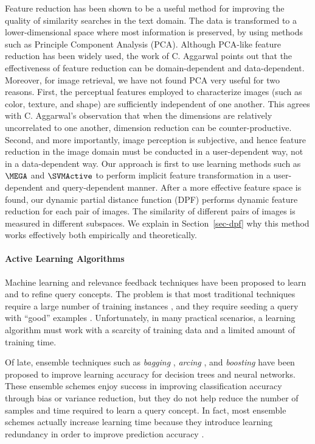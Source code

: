 Feature reduction has been shown to be a useful method for improving
the quality of similarity searches in the text domain.  The data is
transformed to a lower-dimensional space where most information is
preserved, by using methods such as Principle Component Analysis
(PCA).  Although PCA-like feature reduction has been widely used, the
work of C. Aggarwal \cite{Agg-PODS01} points out that the effectiveness
of feature reduction can be domain-dependent and data-dependent.
Moreover, for image retrieval, we have not found PCA very useful for
two reasons.  First, the perceptual features employed to characterize
images (such as color, texture, and shape) are sufficiently independent
of one another.  This agrees with C. Aggarwal's observation that when
the dimensions are relatively uncorrelated to one another, dimension
reduction can be counter-productive.  Second, and more importantly,
image perception is subjective, and hence feature reduction in the
image domain must be conducted in a user-dependent way, not in a
data-dependent way.  Our approach is first to use learning methods such
as $\MEGA$ and $\SVMActive$ to perform implicit feature transformation
in a user-dependent and query-dependent manner.  After a more effective
feature space is found, our dynamic partial distance function (DPF)
performs dynamic feature reduction for each pair of images. The
similarity of different pairs of images is measured in different
subspaces.  We explain in Section~\ref{sec-dpf} why this method works
effectively both empirically and theoretically.

\paragraph{Active Learning Algorithms}

Machine learning and relevance feedback techniques 
have been proposed to learn and to refine query concepts.
The problem is that most traditional techniques
require a large number of training instances \cite{Bish98,KV94,Mit97,ZH01}, 
and they require seeding a query with ``good'' 
examples \cite{JW97,PCM99,WFSP00}.
Unfortunately, in many practical scenarios, 
a learning algorithm must work with
a scarcity of training data
and a limited amount of training time.

Of late, ensemble techniques such as {\em bagging} \cite{Bre96},
{\em arcing} \cite{Bre98},
and {\em boosting} \cite{Grove+Schuurmans:AAAI98,Schapire+al:ICML97} 
have been proposed to improve learning
accuracy for decision trees and neural networks.
These ensemble schemes enjoy success in improving
classification accuracy
through bias or variance reduction,
but they do not help reduce the number of samples and time required
to learn a query concept.  In fact, most ensemble schemes
actually increase learning time because they
introduce learning redundancy in order to improve prediction
accuracy \cite{DB-95,Grove+Schuurmans:AAAI98,JH97,MM-98}.

